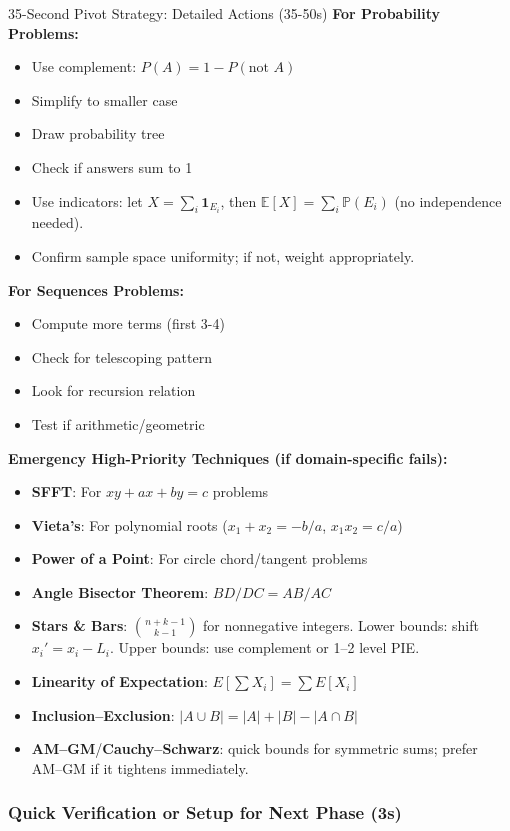 \documentclass{article}
\begin{document}
\begin{classifybox}{35-Second Pivot Strategy: Detailed Actions (35-50s)}
\textbf{For Probability Problems:}
\begin{itemize}[nosep]
\item Use complement: $P(A) = 1 - P(\text{not } A)$
\item Simplify to smaller case
\item Draw probability tree
\item Check if answers sum to 1
\item Use indicators: let \(X=\sum_i \mathbf{1}_{E_i}\), then \(\mathbb{E}[X]=\sum_i \mathbb{P}(E_i)\) (no independence needed).
\item Confirm sample space uniformity; if not, weight appropriately.
\end{itemize}

\textbf{For Sequences Problems:}
\begin{itemize}[nosep]
\item Compute more terms (first 3-4)
\item Check for telescoping pattern
\item Look for recursion relation
\item Test if arithmetic/geometric
\end{itemize}


\textbf{Emergency High-Priority Techniques (if domain-specific fails):}
\begin{itemize}[nosep]
\item \textbf{SFFT}: For $xy+ax+by=c$ problems
\item \textbf{Vieta's}: For polynomial roots ($x_1+x_2=-b/a$, $x_1x_2=c/a$)
\item \textbf{Power of a Point}: For circle chord/tangent problems
\item \textbf{Angle Bisector Theorem}: $BD/DC = AB/AC$
\item \textbf{Stars \& Bars}: $\binom{n+k-1}{k-1}$ for nonnegative integers.
Lower bounds: shift \(x_i' = x_i - L_i\). Upper bounds: use complement or 1–2 level PIE.
\item \textbf{Linearity of Expectation}: $E[\sum X_i]=\sum E[X_i]$
\item \textbf{Inclusion--Exclusion}: $|A \cup B|=|A|+|B|-|A \cap B|$
\item \textbf{AM--GM}/\textbf{Cauchy--Schwarz}: quick bounds for symmetric sums; prefer AM--GM if it tightens immediately.
\end{itemize}

\subsubsection{Quick Verification or Setup for Next Phase (3s)}
{\footnotesize\textcolor{timegreen}{}}


\end{classifybox}
\end{document}
